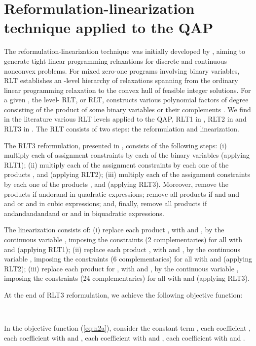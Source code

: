 \documentclass[authoryear,12pt,a4paper,times]{elsarticle}
\begin{document}
\section{Reformulation-linearization technique applied to the QAP} \label{sec:rlt}

The reformulation-linearization technique was initially developed by  
\citet{adams1986}, aiming to generate tight linear programming relaxations for discrete and continuous nonconvex problems.
For mixed zero-one programs involving  binary variables, RLT establishes an -level hierarchy of relaxations spanning from the ordinary linear programming relaxation 
to the convex hull of feasible integer solutions. For a given   , the level- RLT, or RLT, constructs various polynomial factors of degree 
consisting of the product of some  binary variables  or their complements . We find in the literature various RLT levels applied 
to the QAP, RLT1 in \citet{hahn1998}, RLT2 in \citet{adams2007} and RLT3 in \citet{hahn2012}. The RLT consists of two steps: the reformulation and linearization. 

The RLT3 reformulation, presented in \citet{hahn2012}, consists of the following steps: (i) multiply each of  assignment constraints by each of the  
binary variables  (applying  RLT1); (ii) multiply each of the  assignment constraints by each one of the  
products ,  and  (applying RLT2); (iii) multiply each of the  assignment constraints by each one of the
  products ,   and  (applying RLT3). Moreover, remove the products  
if  andorand in quadratic expressions;
remove all products   if and and and or and in cubic expressions;  
and, finally,  remove all products  if andandandandand or and in biquadratic expressions. 

The linearization consists of: (i) replace each product , with  and , by the continuous variable ,   
imposing the constraints   (2 complementaries) for all  with  and  (applying RLT1); (ii) 
replace each product , with  and , by the continuous variable , imposing the constraints 
 (6 complementaries) for all  with  and   (applying RLT2);
(iii) replace each product  for , with  and , by the continuous variable ,
imposing the constraints  (24 complementaries) for all  with  and  (applying RLT3).

At the end of RLT3 reformulation, we achieve the following objective function:




\

In the objective function (\ref{eq:n2a}), consider
 the constant term ,
 each coefficient , 
 each coefficient  with  and ,
 each coefficient  with  and , 
 each coefficient  with  and .
\end{document}
